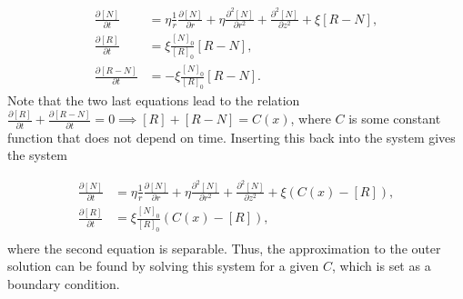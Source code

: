 \documentclass{article}
\begin{document}
\begin{align*}
    \frac{\partial [N]}{\partial t} &= 
    \eta \frac{1}{r} \frac{\partial [N]}{\partial r} +\eta  \frac{\partial^2 [N]}{\partial r^2}  +  \frac{\partial^2 [N]}{\partial z^2} +  \xi [R-N], \\
    \frac{\partial [R]}{\partial t} &=  \xi \frac{[N]_0}{[R]_0} [R-N], \\
    \frac{\partial [R-N]}{\partial t} &= - \xi \frac{[N]_0}{[R]_0} [R-N].
\end{align*}
Note that the two last equations lead to the relation $\frac{\partial [R]}{\partial t} + \frac{\partial [R-N]}{\partial t} = 0 \implies [R] + [R-N] = C(x)$, where $C$ is some constant function that does not depend on time. Inserting this back into the system gives the system

\begin{align*}
    \frac{\partial [N]}{\partial t} &= 
    \eta \frac{1}{r} \frac{\partial [N]}{\partial r} +\eta  \frac{\partial^2 [N]}{\partial r^2}  +  \frac{\partial^2 [N]}{\partial z^2} +  \xi(C(x)-[R]), \\
    \frac{\partial [R]}{\partial t} &=  \xi \frac{[N]_0}{[R]_0} (C(x)-[R]), \\
\end{align*}
where the second equation is separable. Thus, the approximation to the outer solution can be found by solving this system for a given $C$, which is set as a boundary condition. 
\end{document}
